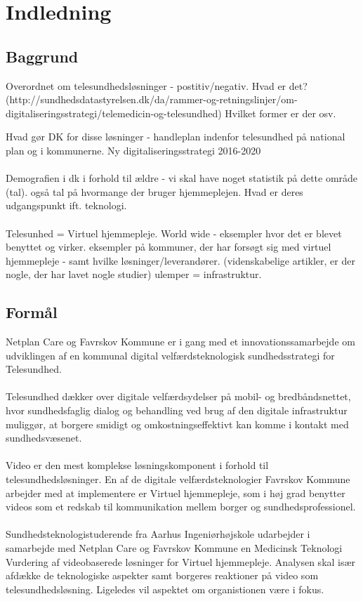 \chapter{Indledning}

\section{Baggrund}
Overordnet om telesundhedsløsninger - postitiv/negativ. Hvad er det? (http://sundhedsdatastyrelsen.dk/da/rammer-og-retningslinjer/om-digitaliseringsstrategi/telemedicin-og-telesundhed) Hvilket former er der osv. 


Hvad gør DK for disse løsninger - handleplan indenfor telesundhed på national plan og i kommunerne. Ny digitaliseringsstrategi 2016-2020
\\ \\
Demografien i dk i forhold til ældre - vi skal have noget statistik på dette område (tal). også tal på hvormange der bruger hjemmeplejen. Hvad er deres udgangspunkt ift. teknologi. 
\\ \\
Telesunhed = Virtuel hjemmepleje. World wide - eksempler hvor det er blevet benyttet og virker. eksempler på kommuner, der har forsøgt sig med virtuel hjemmepleje - samt hvilke løsninger/leverandører. (videnskabelige artikler, er der nogle, der har lavet nogle studier) 
ulemper = infrastruktur.
 

\section{Formål}
Netplan Care og Favrskov Kommune er i gang med et innovationssamarbejde om udviklingen af en kommunal digital velfærdsteknologisk sundhedsstrategi for Telesundhed. 
\\ \\
Telesundhed dækker over digitale velfærdsydelser på mobil- og bredbåndsnettet, hvor sundhedsfaglig dialog og behandling ved brug af den digitale infrastruktur muliggør, at borgere smidigt og omkostningseffektivt kan komme i kontakt med sundhedsvæsenet.    
\\ \\
Video er den mest komplekse løsningskomponent i forhold til telesundhedsløsninger. En af de digitale velfærdsteknologier Favrskov Kommune arbejder med at implementere er Virtuel hjemmepleje, som i høj grad benytter videos som et redskab til kommunikation mellem borger og sundhedsprofessionel. 
\\ \\
Sundhedsteknologistuderende fra Aarhus Ingeniørhøjskole udarbejder i samarbejde med Netplan Care og Favrskov Kommune en Medicinsk Teknologi Vurdering af videobaserede løsninger for Virtuel hjemmepleje. Analysen skal især afdække de teknologiske aspekter samt borgeres reaktioner på video som telesundhedsløsning. Ligeledes vil aspektet om organistionen være i fokus. 

